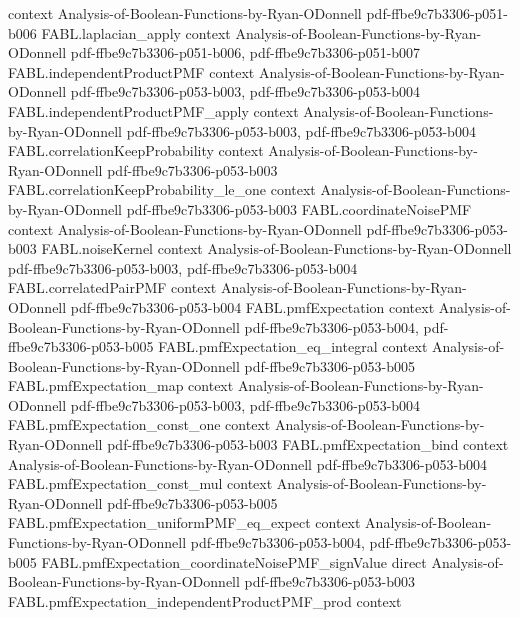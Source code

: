 \begin{theorem}
  {context}
  {Analysis-of-Boolean-Functions-by-Ryan-ODonnell}
  {pdf-ffbe9c7b3306-p051-b006}
\proofstep
  {FABL.laplacian_apply}
  {context}
  {Analysis-of-Boolean-Functions-by-Ryan-ODonnell}
  {pdf-ffbe9c7b3306-p051-b006,
    pdf-ffbe9c7b3306-p051-b007}
\proofstep
  {FABL.independentProductPMF}
  {context}
  {Analysis-of-Boolean-Functions-by-Ryan-ODonnell}
  {pdf-ffbe9c7b3306-p053-b003,
    pdf-ffbe9c7b3306-p053-b004}
\proofstep
  {FABL.independentProductPMF_apply}
  {context}
  {Analysis-of-Boolean-Functions-by-Ryan-ODonnell}
  {pdf-ffbe9c7b3306-p053-b003,
    pdf-ffbe9c7b3306-p053-b004}
\proofstep
  {FABL.correlationKeepProbability}
  {context}
  {Analysis-of-Boolean-Functions-by-Ryan-ODonnell}
  {pdf-ffbe9c7b3306-p053-b003}
\proofstep
  {FABL.correlationKeepProbability_le_one}
  {context}
  {Analysis-of-Boolean-Functions-by-Ryan-ODonnell}
  {pdf-ffbe9c7b3306-p053-b003}
\proofstep
  {FABL.coordinateNoisePMF}
  {context}
  {Analysis-of-Boolean-Functions-by-Ryan-ODonnell}
  {pdf-ffbe9c7b3306-p053-b003}
\proofstep
  {FABL.noiseKernel}
  {context}
  {Analysis-of-Boolean-Functions-by-Ryan-ODonnell}
  {pdf-ffbe9c7b3306-p053-b003,
    pdf-ffbe9c7b3306-p053-b004}
\proofstep
  {FABL.correlatedPairPMF}
  {context}
  {Analysis-of-Boolean-Functions-by-Ryan-ODonnell}
  {pdf-ffbe9c7b3306-p053-b004}
\proofstep
  {FABL.pmfExpectation}
  {context}
  {Analysis-of-Boolean-Functions-by-Ryan-ODonnell}
  {pdf-ffbe9c7b3306-p053-b004,
    pdf-ffbe9c7b3306-p053-b005}
\proofstep
  {FABL.pmfExpectation_eq_integral}
  {context}
  {Analysis-of-Boolean-Functions-by-Ryan-ODonnell}
  {pdf-ffbe9c7b3306-p053-b005}
\proofstep
  {FABL.pmfExpectation_map}
  {context}
  {Analysis-of-Boolean-Functions-by-Ryan-ODonnell}
  {pdf-ffbe9c7b3306-p053-b003,
    pdf-ffbe9c7b3306-p053-b004}
\proofstep
  {FABL.pmfExpectation_const_one}
  {context}
  {Analysis-of-Boolean-Functions-by-Ryan-ODonnell}
  {pdf-ffbe9c7b3306-p053-b003}
\proofstep
  {FABL.pmfExpectation_bind}
  {context}
  {Analysis-of-Boolean-Functions-by-Ryan-ODonnell}
  {pdf-ffbe9c7b3306-p053-b004}
\proofstep
  {FABL.pmfExpectation_const_mul}
  {context}
  {Analysis-of-Boolean-Functions-by-Ryan-ODonnell}
  {pdf-ffbe9c7b3306-p053-b005}
\proofstep
  {FABL.pmfExpectation_uniformPMF_eq_expect}
  {context}
  {Analysis-of-Boolean-Functions-by-Ryan-ODonnell}
  {pdf-ffbe9c7b3306-p053-b004,
    pdf-ffbe9c7b3306-p053-b005}
\proofstep
  {FABL.pmfExpectation_coordinateNoisePMF_signValue}
  {direct}
  {Analysis-of-Boolean-Functions-by-Ryan-ODonnell}
  {pdf-ffbe9c7b3306-p053-b003}
\proofstep
  {FABL.pmfExpectation_independentProductPMF_prod}
  {context}

\end{theorem}
